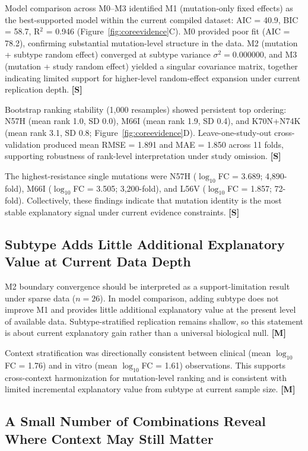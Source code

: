 \documentclass[preprint]{elsarticle}
\newcommand{\claimlabel}[1]{\textbf{[#1]}}
\begin{document}
Model comparison across M0--M3 identified M1 (mutation-only fixed effects) as the best-supported model within the current compiled dataset: AIC = 40.9, BIC = 58.7, R$^{2}$ = 0.946 (Figure~\ref{fig:coreevidence}C). M0 provided poor fit (AIC = 78.2), confirming substantial mutation-level structure in the data. M2 (mutation + subtype random effect) converged at subtype variance $\sigma^2 = 0.000000$, and M3 (mutation + study random effect) yielded a singular covariance matrix, together indicating limited support for higher-level random-effect expansion under current replication depth. \claimlabel{S}

Bootstrap ranking stability (1,000 resamples) showed persistent top ordering: N57H (mean rank 1.0, SD 0.0), M66I (mean rank 1.9, SD 0.4), and K70N+N74K (mean rank 3.1, SD 0.8; Figure~\ref{fig:coreevidence}D). Leave-one-study-out cross-validation produced mean RMSE = 1.891 and MAE = 1.850 across 11 folds, supporting robustness of rank-level interpretation under study omission. \claimlabel{S}

The highest-resistance single mutations were N57H ($\log_{10}$FC = 3.689; 4,890-fold), M66I ($\log_{10}$FC = 3.505; 3,200-fold), and L56V ($\log_{10}$FC = 1.857; 72-fold). Collectively, these findings indicate that mutation identity is the most stable explanatory signal under current evidence constraints. \claimlabel{S}

\subsection{Subtype Adds Little Additional Explanatory Value at Current Data Depth}

M2 boundary convergence should be interpreted as a support-limitation result under sparse data ($n=26$). In model comparison, adding subtype does not improve M1 and provides little additional explanatory value at the present level of available data. Subtype-stratified replication remains shallow, so this statement is about current explanatory gain rather than a universal biological null. \claimlabel{M}

Context stratification was directionally consistent between clinical (mean $\log_{10}$FC = 1.76) and in vitro (mean $\log_{10}$FC = 1.61) observations. This supports cross-context harmonization for mutation-level ranking and is consistent with limited incremental explanatory value from subtype at current sample size. \claimlabel{M}

\subsection{A Small Number of Combinations Reveal Where Context May Still Matter}
\end{document}
